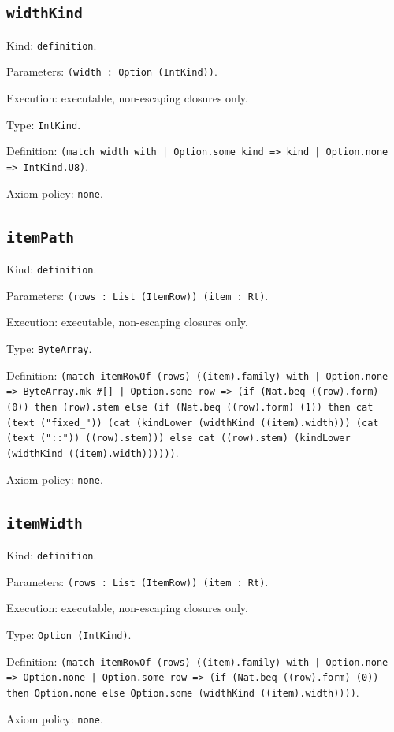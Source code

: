 \documentclass[11pt]{article}
\begin{document}
\subsection*{\texttt{widthKind}}
\noindent Kind: \texttt{definition}.\par
\noindent Parameters: \texttt{(width : Option (IntKind))}.\par
\noindent Execution: executable, non-escaping closures only.\par
\noindent Type: \texttt{IntKind}.\par
\noindent Definition: \texttt{(match width with | Option.some kind => kind | Option.none => IntKind.U8)}.\par
\noindent Axiom policy: \texttt{none}.\par
\subsection*{\texttt{itemPath}}
\noindent Kind: \texttt{definition}.\par
\noindent Parameters: \texttt{(rows : List (ItemRow)) (item : Rt)}.\par
\noindent Execution: executable, non-escaping closures only.\par
\noindent Type: \texttt{ByteArray}.\par
\noindent Definition: \texttt{(match itemRowOf (rows) ((item).family) with | Option.none => ByteArray.mk \#[] | Option.some row => (if (Nat.beq ((row).form) (0)) then (row).stem else (if (Nat.beq ((row).form) (1)) then cat (text ("fixed\_")) (cat (kindLower (widthKind ((item).width))) (cat (text ("::")) ((row).stem))) else cat ((row).stem) (kindLower (widthKind ((item).width))))))}.\par
\noindent Axiom policy: \texttt{none}.\par
\subsection*{\texttt{itemWidth}}
\noindent Kind: \texttt{definition}.\par
\noindent Parameters: \texttt{(rows : List (ItemRow)) (item : Rt)}.\par
\noindent Execution: executable, non-escaping closures only.\par
\noindent Type: \texttt{Option (IntKind)}.\par
\noindent Definition: \texttt{(match itemRowOf (rows) ((item).family) with | Option.none => Option.none | Option.some row => (if (Nat.beq ((row).form) (0)) then Option.none else Option.some (widthKind ((item).width))))}.\par
\noindent Axiom policy: \texttt{none}.\par
\end{document}
